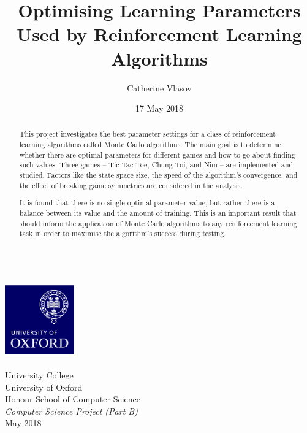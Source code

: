 \documentclass[11pt,a4paper]{report}
\author{Catherine Vlasov}
\title{Optimising Learning Parameters Used by Reinforcement Learning Algorithms}
\date{17 May 2018}
\begin{document}
\makeatletter
	\begin{titlepage}
		\vspace*{\fill}
		\begin{center}
			{\huge \bfseries \@title }
			\\[20ex]
			\includegraphics[width=30mm]{oxlogo.png}
			\\[10ex]
			{\LARGE \@author}
			\\[3ex]
			{\Large University College}
			\\[1ex]
			{\Large University of Oxford}
			\\[8ex]
			{\Large Honour School of Computer Science}
			\\[1ex]
			{\Large \emph{Computer Science Project (Part B)}}
			\\[10ex]
			{\LARGE May 2018}
		\end{center}
		\vspace*{\fill}
	\end{titlepage}
\makeatother


\begin{abstract}

This project investigates the best parameter settings for a class of reinforcement learning algorithms called Monte Carlo algorithms. The main goal is to determine whether there are optimal parameters for different games and how to go about finding such values. Three games -- Tic-Tac-Toe, Chung Toi, and Nim -- are implemented and studied. Factors like the state space size, the speed of the algorithm's convergence, and the effect of breaking game symmetries are considered in the analysis.

It is found that there is no single optimal parameter value, but rather there is a balance between its value and the amount of training. This is an important result that should inform the application of Monte Carlo algorithms to any reinforcement learning task in order to maximise the algorithm's success during testing.

\end{abstract}


\tableofcontents


\end{document}
